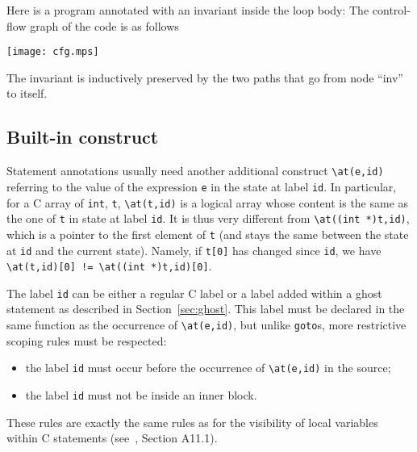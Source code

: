 \begin{example}
Here is a program annotated with an invariant inside the loop body:
The control-flow graph of the code is as follows
\begin{center}
\texttt{[image: cfg.mps]}
\end{center}
The invariant is inductively preserved by the two paths that go from
node ``inv'' to itself.
\end{example}

\begin{example}

\end{example}

\subsection{Built-in construct \texorpdfstring{\at}{\textbackslash{}at}}
\label{sec:at}
 Statement annotations usually need another additional
construct \lstinline|\at(e,id)| referring to the value of the
expression \lstinline|e| in the state at label \lstinline|id|. 
In particular, for a C array of \lstinline|int|, 
\lstinline|t|, \lstinline|\at(t,id)| is a logical
array whose content is the same as the one of \lstinline|t| in state at label
\lstinline|id|. It is thus very different from 
\lstinline|\at((int *)t,id)|, which
is a pointer to the first element of \lstinline|t| (and stays the same between 
the state at \lstinline|id| and the current state). Namely, if 
\lstinline|t[0]| has changed since \lstinline|id|, we have
\lstinline|\at(t,id)[0] != \at((int *)t,id)[0]|.

The label \lstinline|id| can be either a regular C label or a label added
within a ghost statement as described in Section~\ref{sec:ghost}. This
label must be declared in the same function as the occurrence of
\lstinline|\at(e,id)|, but unlike \lstinline|goto|s, more restrictive
scoping rules must be respected:
\begin{itemize}
\item the label \lstinline|id| must occur before the occurrence of
\lstinline|\at(e,id)|
  in the source;
\item the label \lstinline|id| must not be inside an inner block.
\end{itemize}
These rules are exactly the same rules as for the visibility of local
variables within C statements (see~\cite{KR88}, Section A11.1).

